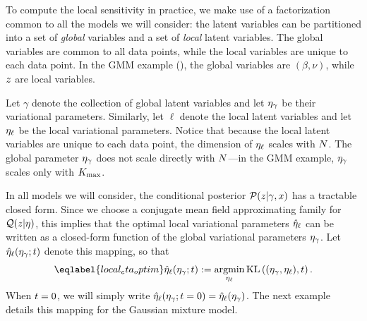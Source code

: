 To compute the local sensitivity in practice, we make use of a factorization
common to all the models we will consider: the latent variables can be
partitioned into a set of \textit{global} variables and a set of \textit{local}
latent variables. The global variables are common to all data points, while the
local variables are unique to each data point. In the GMM example
(), the global variables are $(\beta, \nu)$, while $z$
are local variables.

Let $\gamma$ denote the collection of global latent variables and let $\eta_{\gamma}$
be their variational parameters. Similarly, let $\ell$ denote the local latent
variables and let $\eta_{\ell}$ be the local variational parameters. Notice that
because the local latent variables are unique to each data point, the dimension
of $\eta_{\ell}$ scales with $N$. The global parameter $\eta_{\gamma}$ does not scale
directly with $N$---in the GMM example, $\eta_{\gamma}$ scales only with ${K_{\mathrm{max}}}$.

In all models we will consider, the conditional posterior $\mathcal{P}(z \vert
\gamma,x)$ has a tractable closed form.  Since we choose a conjugate mean field
approximating family for $\mathcal{Q}(z \vert \eta)$, this implies that the optimal
local variational parameters $\hat\eta_{\ell}$ can be written as a closed-form
function of the global variational parameters $\eta_{\gamma}$.  Let
$\hat\eta_{\ell}(\eta_\gamma; t)$ denote this mapping, so that
%
\begin{align}\eqlabel{local_eta_optim}
\etaoptlocal(\etaglob; \t) :=
    \argmin_{\etalocal} \KL{(\eta_\gamma, \etalocal), \t}.
\end{align}
%
When $t=0$, we will simply write $\hat\eta_{\ell}(\eta_{\gamma}; t=0) =
\hat\eta_{\ell}(\eta_{\gamma})$. The next example details this mapping for the Gaussian
mixture model.

